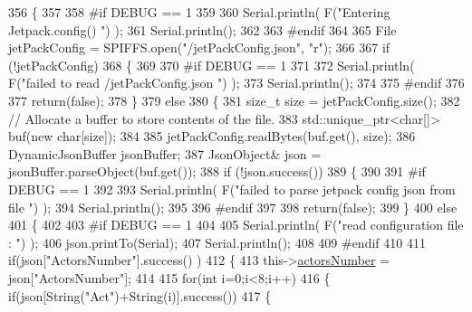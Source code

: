 \begin{DoxyCode}
356 \{
357 
358 \textcolor{preprocessor}{#if DEBUG == 1 }
359 
360     Serial.println( F(\textcolor{stringliteral}{"Entering Jetpack.config() "}) );
361     Serial.println();
362 
363 \textcolor{preprocessor}{#endif}
364 
365     File jetPackConfig = SPIFFS.open(\textcolor{stringliteral}{"/jetPackConfig.json"}, \textcolor{stringliteral}{"r"});
366 
367     \textcolor{keywordflow}{if} (!jetPackConfig) 
368     \{
369 
370 \textcolor{preprocessor}{    #if DEBUG == 1 }
371 
372         Serial.println( F(\textcolor{stringliteral}{"failed to read /jetPackConfig.json "}) );
373         Serial.println();
374 
375 \textcolor{preprocessor}{    #endif}
376 
377         \textcolor{keywordflow}{return}(\textcolor{keyword}{false});
378     \}
379     \textcolor{keywordflow}{else}
380     \{
381         \textcolor{keywordtype}{size\_t} size = jetPackConfig.size();
382         \textcolor{comment}{// Allocate a buffer to store contents of the file.}
383         std::unique\_ptr<char[]> buf(\textcolor{keyword}{new} \textcolor{keywordtype}{char}[size]);
384 
385         jetPackConfig.readBytes(buf.get(), size);
386         DynamicJsonBuffer jsonBuffer;
387         JsonObject& json = jsonBuffer.parseObject(buf.get());
388         \textcolor{keywordflow}{if} (!json.success()) 
389         \{
390         
391 \textcolor{preprocessor}{        #if DEBUG == 1 }
392 
393             Serial.println( F(\textcolor{stringliteral}{"failed to parse jetpack config json from file "}) );
394             Serial.println();
395 
396 \textcolor{preprocessor}{        #endif}
397 
398             \textcolor{keywordflow}{return}(\textcolor{keyword}{false});
399         \} 
400         \textcolor{keywordflow}{else}
401         \{ 
402         
403 \textcolor{preprocessor}{        #if DEBUG == 1 }
404 
405             Serial.println( F(\textcolor{stringliteral}{"read configuration file : "}) );
406             json.printTo(Serial);
407             Serial.println();
408         
409 \textcolor{preprocessor}{        #endif}
410   
411             \textcolor{keywordflow}{if}(json[\textcolor{stringliteral}{"ActorsNumber"}].success() )
412             \{
413                 this->\hyperlink{classJetpack_a52c86319cb3f7f1ab744a64db18a7ba5}{actorsNumber} = json[\textcolor{stringliteral}{"ActorsNumber"}]; 
414             
415                 \textcolor{keywordflow}{for}(\textcolor{keywordtype}{int} i=0;i<8;i++)
416                 \{   \textcolor{keywordflow}{if}(json[String(\textcolor{stringliteral}{"Act"})+String(i)].success())
417                     \{

\end{DoxyCode}
